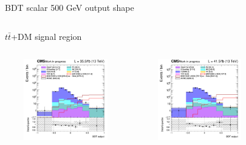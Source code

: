 \documentclass[8pt]{beamer}
\begin{document}
\begin{frame}{BDT scalar 500 GeV output shape}
\vspace{-8pt}
\begin{columns}
\begin{column}{1.09\textwidth}
\begin{block}{\centering $t \bar t$+DM signal region}\end{block} \vspace{10pt}
\end{column}
\end{columns} \vspace{-16pt}
\begin{columns}
		\begin{column}{0.33\textwidth}
			\begin{center}
     			\includegraphics[width=1.0\textwidth, height=100pt]{figs/2016/SmearSR-ttDM-scalar500/log_cratio_TTbar_topCR_ll_BDT_ttDM500_TTbar_BDT_output_scalar500_customBinsAttempt7.png}
    		\end{center}		
		\end{column}
		\begin{column}{0.33\textwidth}
			\begin{center}
     			\includegraphics[width=1.0\textwidth, height=100pt]{figs/2017/SmearSR-ttDM-scalar500/log_cratio_TTbar_topCR_ll_BDT_ttDM500_TTbar_BDT_output_scalar500_customBinsAttempt7.png}
    		\end{center}		
		\end{column}
		\begin{column}{0.33\textwidth}
			\begin{center}

\end{center}
\end{column}
\end{columns}
\end{frame}
\end{document}
